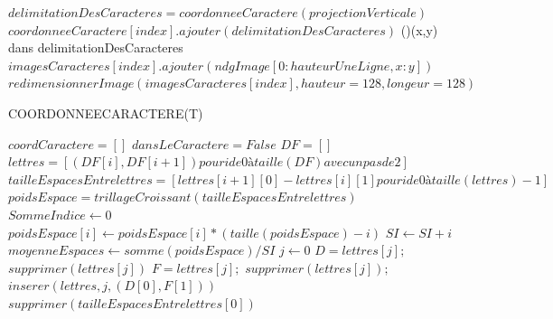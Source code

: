\documentclass[a4paper]{article}
\begin{document}
\begin{algorithm}
{					$delimitationDesCaracteres = coordonneeCaractere(projectionVerticale)$\;
					\BlankLine
					$coordonneeCaractere[index].ajouter(delimitationDesCaracteres)$\;
    				\For(){(x,y) dans delimitationDesCaracteres}
					{
						$imagesCaracteres[index].ajouter(ndgImage[0:hauteurUneLigne, x:y])$\;
					}
					$redimensionnerImage(imagesCaracteres[index],hauteur = 128,longeur = 128)$\;
					\BlankLine
				}
			\end{algorithm}
			\newpage
			\begin{algorithm}
				\LinesNumbered
				\caption{COORDONNEECARACTERE(T)}\label{alg:coordcar}
				\BlankLine
				$coordCaractere = []$\;
				\BlankLine
				$dansLeCaractere = False$\;
				$DF = []$\;
				\BlankLine
				{
				}
				$lettres = [ (DF[i],DF[i+1]) pour i de 0 à taille(DF) avec un pas de 2 ]$\;
				\BlankLine
				$tailleEspacesEntrelettres = [ lettres[i+1][0]-lettres[i][1] pour i de 0 à taille(lettres)-1 ]$\;
				$poidsEspace = trillageCroissant(tailleEspacesEntrelettres)$\;
				\BlankLine
				$SommeIndice \gets 0$\;
				{
					$poidsEspace[i] \gets poidsEspace[i] * (taille(poidsEspace)-i)$\;
				    $SI \gets SI + i$\;
				}
				$moyenneEspaces \gets somme(poidsEspace) / SI$\;
				$j \gets 0$\;
				{
					 {
						$D = lettres[j];$ $supprimer(lettres[j])$\;
						$F = lettres[j];$ $supprimer(lettres[j]);$\;
						$inserer(lettres,j,(D[0],F[1]))$\;
					}	
					$supprimer(tailleEspacesEntrelettres[0])$\;
				}
			\end{algorithm}
\end{document}
